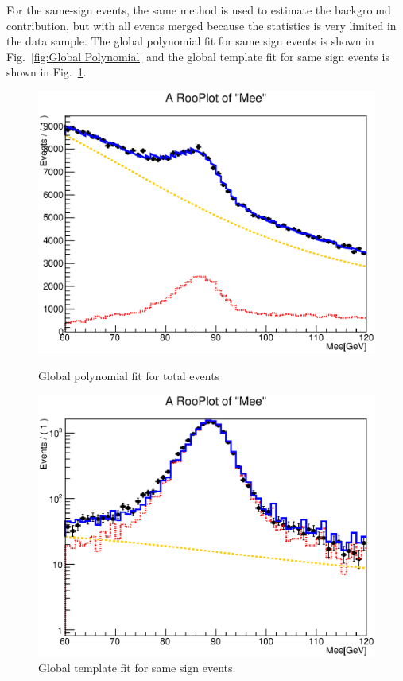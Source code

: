 For the same-sign events, the same method is used to estimate the
background contribution, but with all events merged because the
statistics is very limited in the data sample. The global polynomial
fit for same sign events is shown in Fig.~\ref{fig:Global Polynomial}
and the global template fit for same sign events is shown in
Fig.~\ref{fig:Global Template}.
\begin{figure}[htp]
  \begin{minipage}[t]{0.5\linewidth}
  \centering
  \includegraphics[width=\columnwidth]{figures/ChargeMisID/SS_Polynomial.eps}
  \caption{Global polynomial fit for total events}
  \label{fig:Global Polynomial}
  \end{minipage}
  \begin{minipage}[t]{0.5\linewidth}
  \centering
  \includegraphics[width=\columnwidth]{figures/ChargeMisID/SS_Template.eps}
  \caption{Global template fit for same sign events.}
  \label{fig:Global Template}
  \end{minipage}
\end{figure} 

